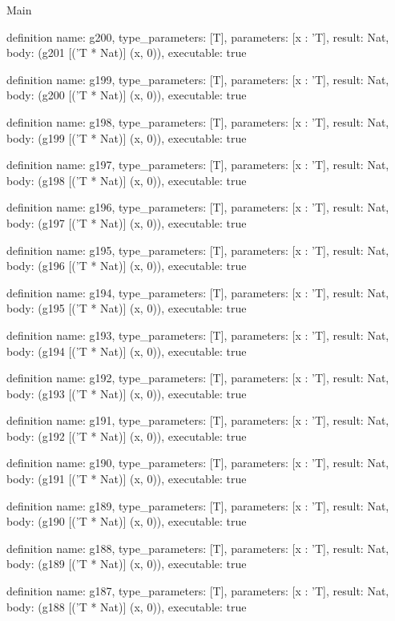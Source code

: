 \begin{lexlean}{Main}
\begin{semanticmodule}
definition{
  name: g200,
  type_parameters: [T],
  parameters: [x : 'T],
  result: Nat,
  body: (g201 [('T * Nat)] (x, 0)),
  executable: true
}

definition{
  name: g199,
  type_parameters: [T],
  parameters: [x : 'T],
  result: Nat,
  body: (g200 [('T * Nat)] (x, 0)),
  executable: true
}

definition{
  name: g198,
  type_parameters: [T],
  parameters: [x : 'T],
  result: Nat,
  body: (g199 [('T * Nat)] (x, 0)),
  executable: true
}

definition{
  name: g197,
  type_parameters: [T],
  parameters: [x : 'T],
  result: Nat,
  body: (g198 [('T * Nat)] (x, 0)),
  executable: true
}

definition{
  name: g196,
  type_parameters: [T],
  parameters: [x : 'T],
  result: Nat,
  body: (g197 [('T * Nat)] (x, 0)),
  executable: true
}

definition{
  name: g195,
  type_parameters: [T],
  parameters: [x : 'T],
  result: Nat,
  body: (g196 [('T * Nat)] (x, 0)),
  executable: true
}

definition{
  name: g194,
  type_parameters: [T],
  parameters: [x : 'T],
  result: Nat,
  body: (g195 [('T * Nat)] (x, 0)),
  executable: true
}

definition{
  name: g193,
  type_parameters: [T],
  parameters: [x : 'T],
  result: Nat,
  body: (g194 [('T * Nat)] (x, 0)),
  executable: true
}

definition{
  name: g192,
  type_parameters: [T],
  parameters: [x : 'T],
  result: Nat,
  body: (g193 [('T * Nat)] (x, 0)),
  executable: true
}

definition{
  name: g191,
  type_parameters: [T],
  parameters: [x : 'T],
  result: Nat,
  body: (g192 [('T * Nat)] (x, 0)),
  executable: true
}

definition{
  name: g190,
  type_parameters: [T],
  parameters: [x : 'T],
  result: Nat,
  body: (g191 [('T * Nat)] (x, 0)),
  executable: true
}

definition{
  name: g189,
  type_parameters: [T],
  parameters: [x : 'T],
  result: Nat,
  body: (g190 [('T * Nat)] (x, 0)),
  executable: true
}

definition{
  name: g188,
  type_parameters: [T],
  parameters: [x : 'T],
  result: Nat,
  body: (g189 [('T * Nat)] (x, 0)),
  executable: true
}

definition{
  name: g187,
  type_parameters: [T],
  parameters: [x : 'T],
  result: Nat,
  body: (g188 [('T * Nat)] (x, 0)),
  executable: true
}


\end{semanticmodule}
\end{lexlean}
